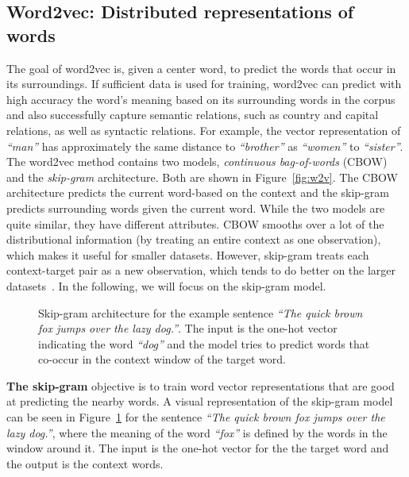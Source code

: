 \subsection{Word2vec: Distributed representations of words}
\label{subsec:word2vec}
The goal of word2vec is, given a center word, to predict the words that occur in its surroundings. If sufficient data is used for training, word2vec can predict with high accuracy the word's meaning based on its surrounding words in the corpus and also successfully capture semantic relations, such as country and capital relations, as well as syntactic relations. For example, the vector representation of  \emph{``man''} has approximately the same distance to \emph{``brother''} as \emph{``women''} to \emph{``sister''}. \\
The word2vec method contains two models, \emph{continuous bag-of-words} (CBOW) and the \emph{skip-gram} architecture. Both are shown in Figure~\ref{fig:w2v}. The CBOW architecture predicts the current word-based on the context and the skip-gram predicts surrounding words given the current word. While the two models are quite similar, they have different attributes. CBOW smooths over a lot of the distributional information (by treating an entire context as one observation), which makes it useful for smaller datasets. However, skip-gram treats each context-target pair as a new observation, which tends to do better on the larger datasets~. In the following, we will focus on the skip-gram model. \\
\begin{figure}
\centering 
\resizebox{0.8\textwidth}{0.5\textwidth}{      

}
\caption{Skip-gram architecture for the example sentence \emph{``The quick brown fox jumps over the lazy dog.''}. The input is the one-hot vector indicating the word \emph{``dog''} and the model tries to predict words that co-occur in the context window of the target word.  }
\label{fig:skip_w2v}
\end{figure}
\noindent
\textbf{The skip-gram} objective is to train word vector representations that are good at predicting the nearby words. A visual representation of the skip-gram model can be seen in Figure~\ref{fig:skip_w2v} for the sentence \emph{``The quick brown fox jumps over the lazy dog.''}, where the meaning of the word \emph{``fox''} is defined by the words in the window around it. The input is the one-hot vector for the the target word and the output is the context words.\\
